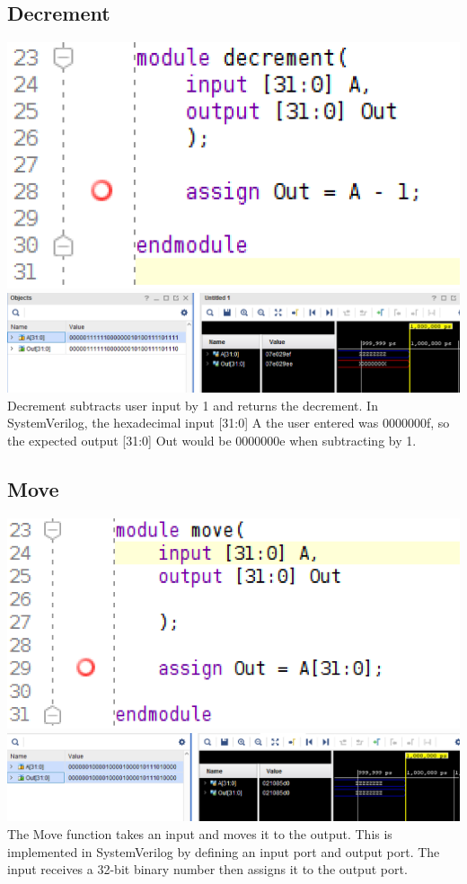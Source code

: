 \documentclass{article}
\begin{document}
\subsection{Decrement}
\includegraphics[scale=.5]{photos/decrement}
\break
\includegraphics[scale=.5]{photos/decrement_simulation}
\break
Decrement subtracts user input by 1 and returns the decrement. In SystemVerilog, the hexadecimal input [31:0] A the user entered was 0000000f, so the expected output [31:0] Out would be 0000000e when subtracting by 1. 

\subsection{Move}
\includegraphics[scale= .5]{photos/move}
\break
\includegraphics[scale= .5]{photos/move_simulation}
\break
The Move function takes an input and moves it to the output. This is implemented in SystemVerilog by defining an input port and output port. The input receives a 32-bit binary number then assigns it to the output port.
\end{document}
